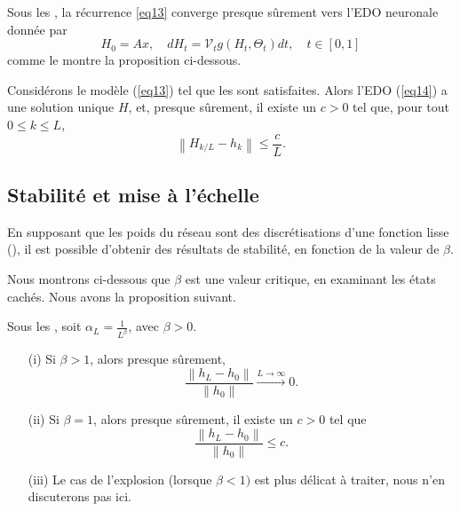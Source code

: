 Sous les , la récurrence \ref{eq13} converge presque sûrement vers l'EDO neuronale donnée par
\begin{equation}\label{eq14}
    H_0=A x, \quad d H_t=\mathscr{V}_t g\left(H_t, \Theta_t\right) d t, \quad t \in[0,1]
\end{equation}
comme le montre la proposition ci-dessous.

\begin{proposition}\label{prop11}
    Considérons le modèle (\ref{eq13}) tel que les  sont satisfaites. Alors l'EDO (\ref{eq14}) a une solution unique $H$, et, presque sûrement, il existe un $c > 0$ tel que, pour tout $0 \leqslant k \leqslant L$,
    \[
        \left\|H_{k / L}-h_k\right\| \leqslant \frac{c}{L}
    .\]
\end{proposition}
\subsection{Stabilité et mise à l'échelle}
En supposant que les poids du réseau sont des discrétisations d'une fonction lisse (), il est possible d'obtenir des résultats de stabilité, en fonction de la valeur de $\beta$.

Nous montrons ci-dessous que $\beta$ est une valeur critique, en examinant les états cachés. Nous avons la proposition suivant.

\begin{proposition}\label{prop12}
    Sous les , soit $\alpha_L = \frac{1}{L^{\beta}}$, avec $\beta >0 $.
    \begin{itemize}
        \item [(i)] Si $\beta > 1 $, alors presque sûrement, 
            \[
                \frac{\left\| h_L - h_0 \right\| }{\left\| h_0 \right\| } \xrightarrow{L \to \infty } 0 
            .\]
        \item [(ii)] Si $\beta = 1 $, alors presque sûrement, il existe un $c > 0$ tel que
            \[
                \frac{\left\| h_L - h_0 \right\| }{\left\| h_0 \right\| } \leqslant c
            .\]
        \item [(iii)] Le cas de l'explosion (lorsque $ \beta < 1) $ est plus délicat à traiter, nous n'en discuterons pas ici.
    \end{itemize}
\end{proposition}

